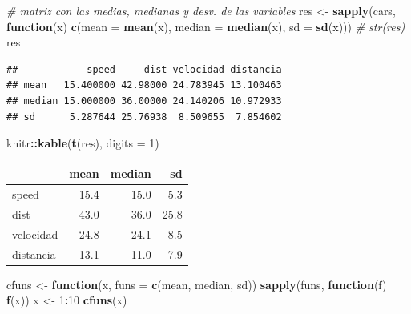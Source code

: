 \documentclass[
]{book}
\newenvironment{Shaded}{\begin{snugshade}}{\end{snugshade}}
\newcommand{\AttributeTok}[1]{\textcolor[rgb]{0.13,0.29,0.53}{#1}}
\newcommand{\CommentTok}[1]{\textcolor[rgb]{0.56,0.35,0.01}{\textit{#1}}}
\newcommand{\ControlFlowTok}[1]{\textcolor[rgb]{0.13,0.29,0.53}{\textbf{#1}}}
\newcommand{\DecValTok}[1]{\textcolor[rgb]{0.00,0.00,0.81}{#1}}
\newcommand{\FunctionTok}[1]{\textcolor[rgb]{0.13,0.29,0.53}{\textbf{#1}}}
\newcommand{\NormalTok}[1]{#1}
\newcommand{\OtherTok}[1]{\textcolor[rgb]{0.56,0.35,0.01}{#1}}
\newcommand{\SpecialCharTok}[1]{\textcolor[rgb]{0.81,0.36,0.00}{\textbf{#1}}}
\begin{document}
\begin{Shaded}
\begin{Highlighting}[]
\CommentTok{\# matriz con las medias, medianas y desv. de las variables}
\NormalTok{res }\OtherTok{\textless{}{-}} \FunctionTok{sapply}\NormalTok{(cars, }
          \ControlFlowTok{function}\NormalTok{(x) }\FunctionTok{c}\NormalTok{(}\AttributeTok{mean =} \FunctionTok{mean}\NormalTok{(x), }\AttributeTok{median =} \FunctionTok{median}\NormalTok{(x), }\AttributeTok{sd =} \FunctionTok{sd}\NormalTok{(x)))}
\CommentTok{\# str(res)}
\NormalTok{res}
\end{Highlighting}
\end{Shaded}

\begin{verbatim}
##            speed     dist velocidad distancia
## mean   15.400000 42.98000 24.783945 13.100463
## median 15.000000 36.00000 24.140206 10.972933
## sd      5.287644 25.76938  8.509655  7.854602
\end{verbatim}

\begin{Shaded}
\begin{Highlighting}[]
\NormalTok{knitr}\SpecialCharTok{::}\FunctionTok{kable}\NormalTok{(}\FunctionTok{t}\NormalTok{(res), }\AttributeTok{digits =} \DecValTok{1}\NormalTok{)}
\end{Highlighting}
\end{Shaded}

\begin{tabular}{l|r|r|r}
\hline
  & mean & median & sd\\
\hline
speed & 15.4 & 15.0 & 5.3\\
\hline
dist & 43.0 & 36.0 & 25.8\\
\hline
velocidad & 24.8 & 24.1 & 8.5\\
\hline
distancia & 13.1 & 11.0 & 7.9\\
\hline
\end{tabular}

\begin{Shaded}
\begin{Highlighting}[]
\NormalTok{cfuns }\OtherTok{\textless{}{-}} \ControlFlowTok{function}\NormalTok{(x, }\AttributeTok{funs =} \FunctionTok{c}\NormalTok{(mean, median, sd))}
            \FunctionTok{sapply}\NormalTok{(funs, }\ControlFlowTok{function}\NormalTok{(f) }\FunctionTok{f}\NormalTok{(x))}
\NormalTok{x }\OtherTok{\textless{}{-}} \DecValTok{1}\SpecialCharTok{:}\DecValTok{10}
\FunctionTok{cfuns}\NormalTok{(x)}
\end{Highlighting}
\end{Shaded}
\end{document}
